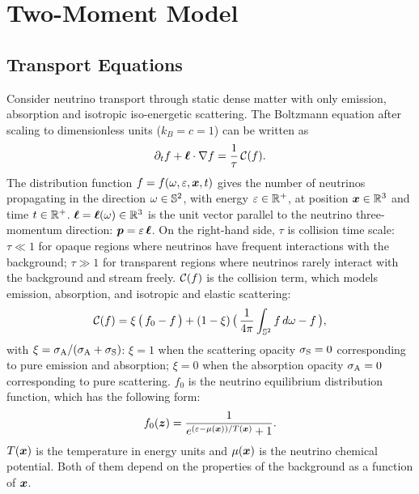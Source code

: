 \section{Two-Moment Model}
\label{se:Two-MomentModel}

\subsection{Transport Equations}
Consider neutrino transport through static dense matter with only emission, absorption and isotropic iso-energetic scattering.
The Boltzmann equation after scaling to dimensionless units ($k_{B} = c = 1$) can be written as
\begin{equation}
  \pd{f}{t}+\vect{\ell}\cdot\nabla f
  =\f{1}{\tau}\,\cC(f).
  \label{eq:boltzmann}
\end{equation}
The distribution function $f = f(\omega,\varepsilon,\boldsymbol{x},t)$ gives the number of neutrinos propagating in the direction $\omega\in\mathbb{S}^{2}$, with energy $\varepsilon\in\mathbb{R}^{+}$, at position $\boldsymbol{x}\in\mathbb{R}^{3}$ and time $t\in\mathbb{R}^{+}$.  
$\boldsymbol{\ell} = \boldsymbol{\ell}(\omega)\in\mathbb{R}^{3}$ is the unit vector parallel to the neutrino three-momentum direction: $\boldsymbol{p}=\varepsilon\,\boldsymbol{\ell}$.
On the right-hand side, $\tau$ is collision time scale: $\tau\ll1$ for opaque regions where neutrinos have frequent interactions with the background; $\tau\gg1$ for transparent regions where neutrinos rarely interact with the background and stream freely.
$\mathcal{C}(f)$ is the collision term, which models emission, absorption, and isotropic and elastic scattering: 
\begin{equation}
  \cC(f)=\xi\,\big(\,f_{0}-f\,\big)
  +(1-\xi)\,\big(\,\f{1}{4\pi}\int_{\bbS^{2}}f\,d\omega-f\,\big),
  \label{eq:collisionTerm}
\end{equation}
with $\xi = \sigma_{{\rm A}} / (\sigma_{{\rm A}}  + \sigma_{{\rm S}} )$: $\xi = 1$ when the scattering opacity $\sigma_{{\rm S}} = 0$ corresponding to pure emission and absorption; $\xi = 0$ when the absorption opacity $\sigma_{{\rm A}} = 0$ corresponding to pure scattering. 
$f_{0}$ is the neutrino equilibrium distribution function, which has the following form:
\begin{equation}
  f_{0}(\vect{z})=\f{1}{e^{(\varepsilon-\mu(\vect{x}))/T(\vect{x})}+1}.
  \label{eq:fermiDirac}
\end{equation}
$T(\boldsymbol{x})$ is the temperature in energy units and $\mu(\boldsymbol{x})$ is the neutrino chemical potential.
Both of them depend on the properties of the background as a function of $\boldsymbol{x}$.

